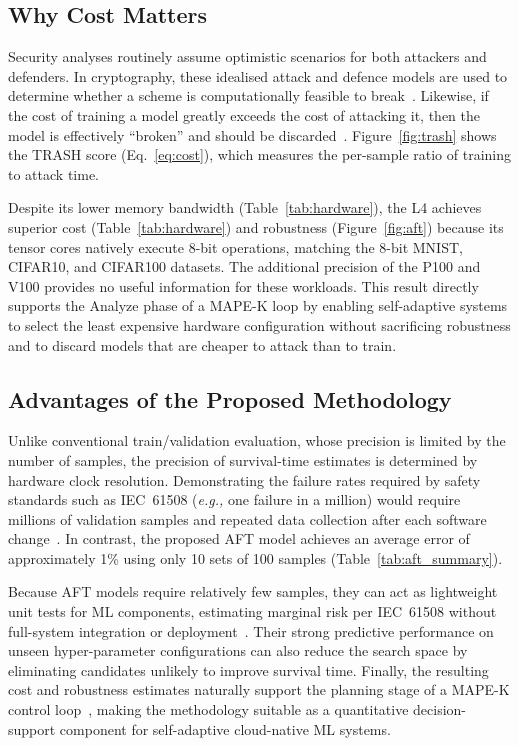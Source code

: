 \documentclass[conference]{IEEEtran}%
\begin{document}
\subsection{Why Cost Matters}

Security analyses routinely assume optimistic scenarios for both attackers and defenders. 
In cryptography, these idealised attack and defence models are used to determine whether a scheme is computationally feasible to break~\cite{kamal2017study,leurent2020sha}. 
Likewise, if the cost of training a model greatly exceeds the cost of attacking it, then the model is effectively ``broken'' and should be discarded~\cite{meyers_aft}. 
Figure~\ref{fig:trash} shows the TRASH score (Eq.~\ref{eq:cost}), which measures the per-sample ratio of training to attack time.

Despite its lower memory bandwidth (Table~\ref{tab:hardware}), the L4 achieves superior cost (Table~\ref{tab:hardware}) and robustness (Figure~\ref{fig:aft}) because its tensor cores natively execute 8-bit operations, matching the 8-bit MNIST, CIFAR10, and CIFAR100 datasets. 
The additional precision of the P100 and V100 provides no useful information for these workloads. 
This result directly supports the Analyze phase of a MAPE-K loop by enabling self-adaptive systems to select the least expensive hardware configuration without sacrificing robustness and to discard models that are cheaper to attack than to train.

\subsection{Advantages of the Proposed Methodology}
\label{advantages}

Unlike conventional train/validation evaluation, whose precision is limited by the number of samples, the precision of survival-time estimates is determined by hardware clock resolution. 
Demonstrating the failure rates required by safety standards such as IEC~61508 (\textit{e.g.,} one failure in a million) would require millions of validation samples and repeated data collection after each software change~\cite{IEC61508}. 
In contrast, the proposed AFT model achieves an average error of approximately 1\% using only 10 sets of 100 samples (Table~\ref{tab:aft_summary}).

Because AFT models require relatively few samples, they can act as lightweight unit tests for ML components, estimating marginal risk per IEC~61508 without full-system integration or deployment~\cite{IEC61508,schmoor2000sample,lachin1981introduction}. 
Their strong predictive performance on unseen hyper-parameter configurations can also reduce the search space by eliminating candidates unlikely to improve survival time. Finally, the resulting cost and robustness estimates naturally support the planning stage of a MAPE-K control loop~\cite{kephart2003vision}, making the methodology suitable as a quantitative decision-support component for self-adaptive cloud-native ML systems.
\end{document}
